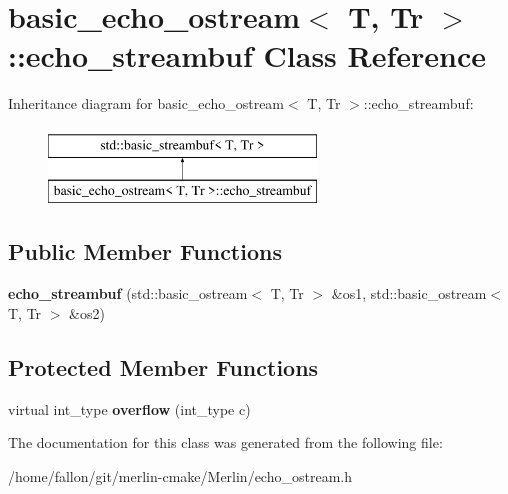 \hypertarget{classbasic__echo__ostream_1_1echo__streambuf}{}\section{basic\+\_\+echo\+\_\+ostream$<$ T, Tr $>$\+:\+:echo\+\_\+streambuf Class Reference}
\label{classbasic__echo__ostream_1_1echo__streambuf}
Inheritance diagram for basic\+\_\+echo\+\_\+ostream$<$ T, Tr $>$\+:\+:echo\+\_\+streambuf\+:\begin{figure}[H]
\begin{center}
\leavevmode
\includegraphics[height=2.000000cm]{classbasic__echo__ostream_1_1echo__streambuf}
\end{center}
\end{figure}
\subsection*{Public Member Functions}
\begin{DoxyCompactItemize}
\item 
\mbox{\label{classbasic__echo__ostream_1_1echo__streambuf_a6786d570d7a3c2d1b5846b89bfb5bac6}} 
{\bfseries echo\+\_\+streambuf} (std\+::basic\+\_\+ostream$<$ T, Tr $>$ \&os1, std\+::basic\+\_\+ostream$<$ T, Tr $>$ \&os2)
\end{DoxyCompactItemize}
\subsection*{Protected Member Functions}
\begin{DoxyCompactItemize}
\item 
\mbox{\label{classbasic__echo__ostream_1_1echo__streambuf_a3940a28cc68fab9e66aee12856537972}} 
virtual int\+\_\+type {\bfseries overflow} (int\+\_\+type c)
\end{DoxyCompactItemize}


The documentation for this class was generated from the following file\+:\begin{DoxyCompactItemize}
\item 
/home/fallon/git/merlin-\/cmake/\+Merlin/echo\+\_\+ostream.\+h\end{DoxyCompactItemize}
